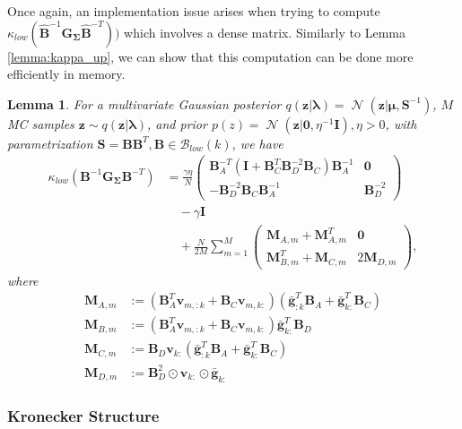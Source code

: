 \documentclass[a4paper, 11pt, oneside]{scrartcl}
\theoremstyle{break}
\newtheorem{lemma}{Lemma}[section]
\DeclareMathOperator{\Normal}{\mathcal{N}}
\newcommand{\matr}[1]{\boldsymbol{#1}}
\newcommand{\set}[1]{\mathcal{#1}}
\numberwithin{equation}{section}
\begin{document}
				Once again, an implementation issue arises when trying to compute $\kappa_{low}(\matr{\hat{B}}^{-1} \matr{G_{\Sigma}} \matr{\hat{B}}^{-T}))$ which involves a dense matrix. 
				Similarly to Lemma \ref{lemma:kappa_up}, we can show that this computation can be done more efficiently in memory.
				\begin{lemma}
					For a multivariate Gaussian posterior $q(\matr{z} | \matr{\lambda}) = \Normal(\matr{z} | \matr{\mu}, \matr{S}^{-1})$, $M$ MC samples $\matr{z} \sim q(\matr{z} | \matr{\lambda})$, and prior $p(z) = \Normal(\matr{z} | \matr{0}, \eta^{-1} \matr{I}), \eta > 0$, with parametrization $\matr{S} = \matr{B} \matr{B}^T, \matr{B} \in \set{B}_{low}(k)$, we have
						\begin{align*}
							\kappa_{low}(\matr{B}^{-1} \matr{G_{\Sigma}} \matr{B}^{-T}) &= \frac{\gamma \eta}{N}\begin{pmatrix} \matr{B}_A^{-T} (\matr{I} + \matr{B}_C^T \matr{B}_D^{-2} \matr{B}_C) \matr{B}_A^{-1} & \matr{0} \\ -\matr{B}_D^{-2} \matr{B}_C \matr{B}_A^{-1} & \matr{B}_D^{-2} \end{pmatrix} \\
							&\quad - \gamma \matr{I} \\
							&\quad + \frac{N}{2 M} \sum_{m=1}^M \begin{pmatrix} \matr{M}_{A, m} + \matr{M}_{A, m}^T & \matr{0} \\ \matr{M}_{B, m}^T + \matr{M}_{C, m} & 2\matr{M}_{D, m} \end{pmatrix},
						\end{align*}
						where 
						\begin{align*}
							\matr{M}_{A, m} &:= (\matr{B}_A^T \matr{v}_{m, :k} + \matr{B}_C \matr{v}_{m, k:}) (\matr{\bar{g}}_{:k}^T \matr{B}_A + \matr{\bar{g}}_{k:}^T \matr{B}_C) \\
							\matr{M}_{B, m} &:= (\matr{B}_A^T \matr{v}_{m, :k} + \matr{B}_C \matr{v}_{m, k:}) \matr{\bar{g}}_{k:}^T \matr{B}_D \\
							\matr{M}_{C, m} &:= \matr{B}_D \matr{v}_{k:} (\matr{\bar{g}}_{:k}^T \matr{B}_A + \matr{\bar{g}}_{k:}^T \matr{B}_C ) \\
							\matr{M}_{D, m} &:= \matr{B}_D^2 \odot \matr{v}_{k:} \odot \matr{\bar{g}}_{k:}
						\end{align*}
						\label{lemma:kappa_low}
				\end{lemma}
				
			\subsubsection{Kronecker Structure}
\end{document}
